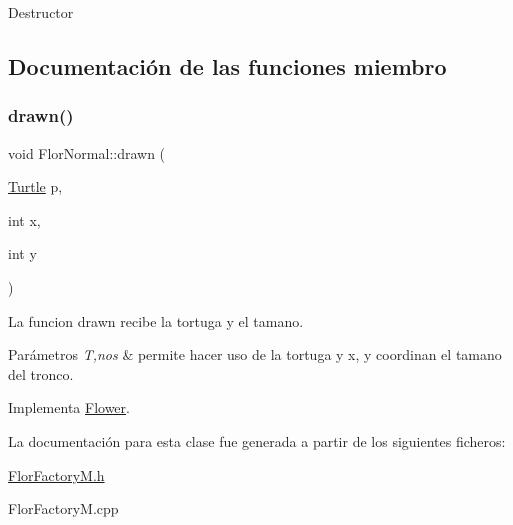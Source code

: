 Destructor 

\subsection{Documentación de las funciones miembro}
\mbox{\label{classFlorNormal_a2e8ae341ef8bea1459baa12966eb1cd2}} 
\subsubsection{\texorpdfstring{drawn()}{drawn()}}
{\footnotesize\ttfamily void Flor\+Normal\+::drawn (\begin{DoxyParamCaption}\item[{\hyperlink{classTurtle}{Turtle}}]{p,  }\item[{int}]{x,  }\item[{int}]{y }\end{DoxyParamCaption})\hspace{0.3cm}{\ttfamily [virtual]}}

La funcion drawn recibe la tortuga y el tamano. 
\begin{DoxyParams}{Parámetros}
{\em T,nos} & permite hacer uso de la tortuga y x, y coordinan el tamano del tronco. \\
\hline
\end{DoxyParams}


Implementa \hyperlink{classFlower_af01eea570f9d02e16cda1d86ee97633c}{Flower}.



La documentación para esta clase fue generada a partir de los siguientes ficheros\+:\begin{DoxyCompactItemize}
\item 
\hyperlink{FlorFactoryM_8h}{Flor\+Factory\+M.\+h}\item 
Flor\+Factory\+M.\+cpp\end{DoxyCompactItemize}
